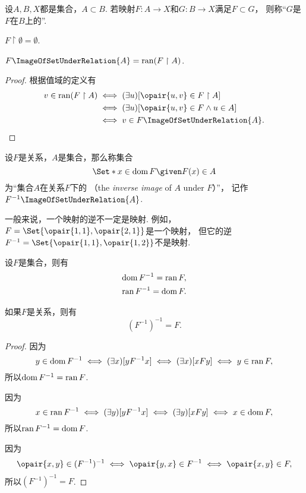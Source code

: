 \begin{definition}
设\(A,B,X\)都是集合，\(A \subset B\).
若映射\(F\colon A \to X\)和\(G\colon B \to X\)满足\(F \subset G\)，
则称“\(G\)是\(F\)在\(B\)上的”.
\end{definition}

\begin{theorem}
\(F \upharpoonright \emptyset = \emptyset\).
\end{theorem}

\begin{theorem}
\(F\ImageOfSetUnderRelation{A} = \ran(F \upharpoonright A)\).
\begin{proof}
根据值域的定义有\begin{align*}
	v \in \ran(F \upharpoonright A)
	&\iff
	(\exists u)[\opair{u,v} \in F \upharpoonright A] \\
	&\iff
	(\exists u)[\opair{u,v} \in F \land u \in A] \\
	&\iff
	v \in F\ImageOfSetUnderRelation{A}.
	\qedhere
\end{align*}
\end{proof}
\end{theorem}

\begin{definition}
设\(F\)是关系，\(A\)是集合，那么称集合\[
	\Set*{ x \in \dom F \given F(x) \in A }
\]为“集合\(A\)在关系\(F\)下的%
（the \emph{inverse image} of \(A\) under \(F\)）”，
记作\(F^{-1}\ImageOfSetUnderRelation{A}\).
\end{definition}

一般来说，一个映射的逆不一定是映射.
例如，\(F=\Set{ \opair{1,1},\opair{2,1} }\)是一个映射，
但它的逆\(F^{-1}=\Set{ \opair{1,1},\opair{1,2} }\)不是映射.

\begin{theorem}\label{theorem:集合论.关系的逆的定义域值域以及关系的二重逆}
设\(F\)是集合，则有\begin{gather}
	\operatorname{dom} F^{-1} = \operatorname{ran} F, \\
	\operatorname{ran} F^{-1} = \operatorname{dom} F.
\end{gather}

如果\(F\)是关系，则有\begin{equation}
	(F^{-1})^{-1} = F.
\end{equation}
\begin{proof}
因为\[
	y \in \operatorname{dom} F^{-1}
	\iff
	(\exists x)[yF^{-1}x]
	\iff
	(\exists x)[xFy]
	\iff
	y \in \operatorname{ran} F,
\]
所以\(\operatorname{dom} F^{-1} = \operatorname{ran} F\).

因为\[
	x \in \operatorname{ran} F^{-1}
	\iff
	(\exists y)[yF^{-1}x]
	\iff
	(\exists y)[xFy]
	\iff
	x \in \operatorname{dom} F,
\]
所以\(\operatorname{ran} F^{-1} = \operatorname{dom} F\).

因为\[
	\opair{x,y} \in (F^{-1})^{-1}
	\iff
	\opair{y,x} \in F^{-1}
	\iff
	\opair{x,y} \in F,
\]
所以\((F^{-1})^{-1} = F\).
\end{proof}
\end{theorem}

